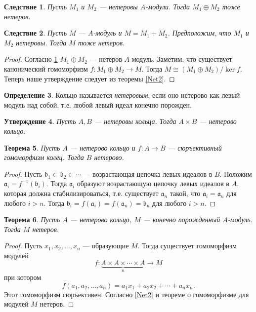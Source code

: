 \documentclass[12pt, titlepage, oneside]{amsbook}
\newcommand{\aaa}{\mathfrak{a}}
\newcommand{\bbb}{\mathfrak{b}}
\newtheorem{theorem}{Теорема}[chapter]
\newtheorem{corollary}[theorem]{Следствие}
\newtheorem{claim}[theorem]{Утверждение}
\theoremstyle{definition}
\newtheorem{definition}[theorem]{Определение}
\theoremstyle{remark}
\begin{document}
\begin{corollary}
	\label{Net4}
	Пусть $M_1$ и $M_2$ --- нетеровы $A$-модули. Тогда $M_1\oplus M_2$ тоже нетеров.
\end{corollary}

\begin{corollary}
	\label{Net5}
	Пусть $M$ --- $A$-модуль и $M=M_1+M_2$. Предположим, что $M_1$ и $M_2$ нетеровы. Тогда $M$ тоже нетеров.
\end{corollary}

\begin{proof}
	Согласно \ref{Net4} $M_1\oplus M_2$ --- нетеров $A$-модуль. Заметим, что существует канонический гомоморфизм $f\colon M_1\oplus M_2\rightarrow M$. Тогда $M\cong(M_1\oplus M_2)/\ker f$. Теперь наше утверждение следует из теоремы \ref{Net2}.
\end{proof}

\begin{definition}
	Кольцо называется \emph{нетеровым}, если оно нетерово как левый модуль над собой, т.е. любой левый идеал конечно порожден.
\end{definition}

\begin{claim}
	\label{Net6}
	Пусть $A,B$ --- нетеровы кольца. Тогда $A\times B$ --- нетерово кольцо.
\end{claim}

\begin{theorem}
	\label{Net7}
	Пусть $A$ --- нетерово кольцо и $f\colon A\rightarrow B$ --- сюръективный гомоморфизм колец. Тогда $B$ нетерово.
\end{theorem}

\begin{proof}
	Пусть $\bbb_1\subset\bbb_2\subset\cdots$ --- возрастающая цепочка левых идеалов в $B$. Положим $\aaa_i=f^{-1}(\bbb_i)$. Тогда $\aaa_i$ образуют возрастающую цепочку левых идеалов в $A$, которая должна стабилизироваться, т.е. существует $\aaa_n$ такой, что $\aaa_i=\aaa_n$ для любого $i>n$. Тогда $\bbb_i=f(\aaa_i)=f(\aaa_n)=\bbb_n$ для любого $i>n$.
\end{proof}

\begin{theorem}
	\label{Net8}
	Пусть $A$ --- нетерово кольцо, $M$ --- конечно порожденный $A$-модуль. Тогда $M$ нетеров.
\end{theorem}

\begin{proof}
	Пусть $x_1,x_2,\ldots,x_n$ --- образующие $M$. Тогда существует гомоморфизм модулей $$f\colon \underbrace{A\times A\times\cdots\times A}_n\rightarrow M$$ при котором $$f(a_1,a_2,\ldots,a_n)=a_1x_1+a_2x_2+\cdots+a_nx_n.$$ Этот гомоморфизм сюръективен. Согласно \ref{Net2} и теореме о гомоморфизме для модулей $M$ нетеров.
\end{proof}
\end{document}
